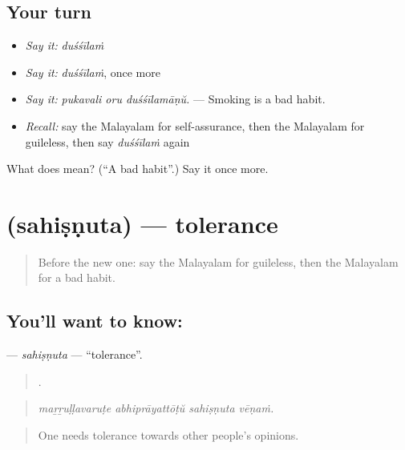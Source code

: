 \subsection*{Your turn}
\begin{itemize}
\raggedright
  \item \emph{Say it:} \emph{duśśīlaṁ}
  \item \emph{Say it:} \emph{duśśīlaṁ}, once more
  \item \emph{Say it:} \emph{pukavali oru duśśīlamāṇŭ.} — Smoking is a bad habit.
  \item \emph{Recall:} say the Malayalam for self-assurance, then the Malayalam for guileless, then say \emph{duśśīlaṁ} again
\end{itemize}

\begin{tcolorbox}[breakable,colback=teal!4,colframe=teal!35!black,title={Before you move on}]
What does  mean? (\textquotedblleft{}A bad habit\textquotedblright{}.) Say it once more.
\end{tcolorbox}
\section[\texorpdfstring{\ml{സഹിഷ്ണുത} (sahiṣṇuta)}{സഹിഷ്ണുത (sahiṣṇuta)}]{ (sahiṣṇuta) — tolerance}

\label{lesson:ML-C529-sahisnuta}



\begin{quote}
Before the new one: say the Malayalam for guileless, then the Malayalam for a bad habit.
\end{quote}

\subsection*{You'll want to know: }
\textbf{} — \emph{sahiṣṇuta} — \textquotedblleft{}tolerance\textquotedblright{}.

\begin{quote}
   .
\end{quote}

\begin{quote}
\emph{maṟṟuḷḷavaruṭe abhiprāyattōṭŭ sahiṣṇuta vēṇaṁ.}
\end{quote}

\begin{quote}
One needs tolerance towards other people's opinions.
\end{quote}

